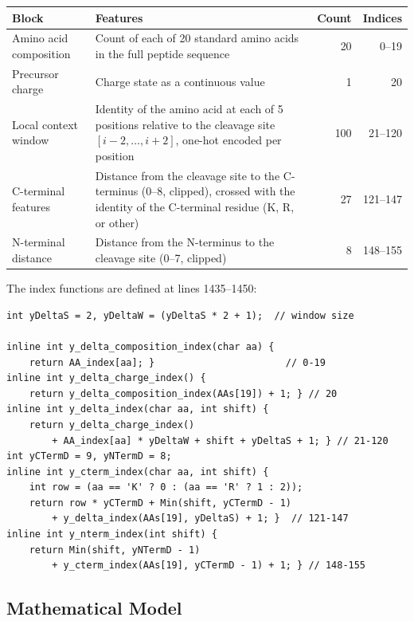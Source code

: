 \documentclass[11pt,a4paper]{article}
\begin{document}
\begin{center}
\begin{longtable}{p{3.5cm}p{6cm}rr}
\toprule
\textbf{Block} & \textbf{Features} & \textbf{Count} & \textbf{Indices} \\
\midrule
\endhead
Amino acid composition & Count of each of 20 standard amino acids in the full peptide sequence & 20 & 0--19 \\
\addlinespace
Precursor charge & Charge state as a continuous value & 1 & 20 \\
\addlinespace
Local context window & Identity of the amino acid at each of 5 positions relative to the cleavage site $[i{-}2, \ldots, i{+}2]$, one-hot encoded per position & 100 & 21--120 \\
\addlinespace
C-terminal features & Distance from the cleavage site to the C-terminus (0--8, clipped), crossed with the identity of the C-terminal residue (K, R, or other) & 27 & 121--147 \\
\addlinespace
N-terminal distance & Distance from the N-terminus to the cleavage site (0--7, clipped) & 8 & 148--155 \\
\bottomrule
\end{longtable}
\end{center}

The index functions are defined at lines 1435--1450:

\begin{lstlisting}[caption={Feature index functions for yDelta (lines 1435--1450)}]
int yDeltaS = 2, yDeltaW = (yDeltaS * 2 + 1);  // window size

inline int y_delta_composition_index(char aa) {
    return AA_index[aa]; }                       // 0-19
inline int y_delta_charge_index() {
    return y_delta_composition_index(AAs[19]) + 1; } // 20
inline int y_delta_index(char aa, int shift) {
    return y_delta_charge_index()
        + AA_index[aa] * yDeltaW + shift + yDeltaS + 1; } // 21-120
int yCTermD = 9, yNTermD = 8;
inline int y_cterm_index(char aa, int shift) {
    int row = (aa == 'K' ? 0 : (aa == 'R' ? 1 : 2));
    return row * yCTermD + Min(shift, yCTermD - 1)
        + y_delta_index(AAs[19], yDeltaS) + 1; }  // 121-147
inline int y_nterm_index(int shift) {
    return Min(shift, yNTermD - 1)
        + y_cterm_index(AAs[19], yCTermD - 1) + 1; } // 148-155
\end{lstlisting}

\subsection{Mathematical Model}
\end{document}

